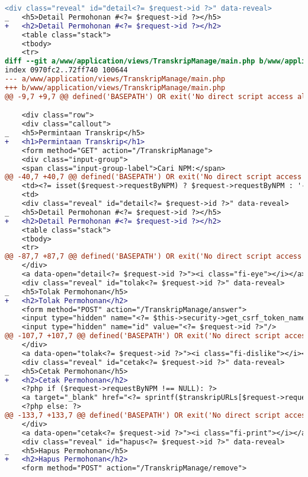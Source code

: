 \begin{itemize}
\begin{lstlisting}[frame=single, label={lst:perbaikan_1.3.1_tag_heading}, language=diff, caption=Perbaikan Kriteria Sukses 1.3.1 pada Bagian \textit{Heading}]
    <div class="reveal" id="detail<?= $request->id ?>" data-reveal>
_   <h5>Detail Permohonan #<?= $request->id ?></h5>
+   <h2>Detail Permohonan #<?= $request->id ?></h2>
    <table class="stack">
    <tbody>
    <tr>
diff --git a/www/application/views/TranskripManage/main.php b/www/application/views/TranskripManage/main.php
index 0970fc2..72ff740 100644
--- a/www/application/views/TranskripManage/main.php
+++ b/www/application/views/TranskripManage/main.php
@@ -9,7 +9,7 @@ defined('BASEPATH') OR exit('No direct script access allowed');

    <div class="row">
    <div class="callout">
_   <h5>Permintaan Transkrip</h5>
+   <h1>Permintaan Transkrip</h1>
    <form method="GET" action="/TranskripManage">
    <div class="input-group">
    <span class="input-group-label">Cari NPM:</span>
@@ -40,7 +40,7 @@ defined('BASEPATH') OR exit('No direct script access allowed');
    <td><?= isset($request->requestByNPM) ? $request->requestByNPM : '-' ?></td>
    <td>
    <div class="reveal" id="detail<?= $request->id ?>" data-reveal>
_   <h5>Detail Permohonan #<?= $request->id ?></h5>
+   <h2>Detail Permohonan #<?= $request->id ?></h2>
    <table class="stack">
    <tbody>
    <tr>
@@ -87,7 +87,7 @@ defined('BASEPATH') OR exit('No direct script access allowed');
    </div>
    <a data-open="detail<?= $request->id ?>"><i class="fi-eye"></i></a>
    <div class="reveal" id="tolak<?= $request->id ?>" data-reveal>
_   <h5>Tolak Permohonan</h5>
+   <h2>Tolak Permohonan</h2>
    <form method="POST" action="/TranskripManage/answer">
    <input type="hidden" name="<?= $this->security->get_csrf_token_name() ?>" value="<?= $this->security->get_csrf_hash() ?>" />
    <input type="hidden" name="id" value="<?= $request->id ?>"/>
@@ -107,7 +107,7 @@ defined('BASEPATH') OR exit('No direct script access allowed');
    </div>
    <a data-open="tolak<?= $request->id ?>"><i class="fi-dislike"></i></a>
    <div class="reveal" id="cetak<?= $request->id ?>" data-reveal>
_   <h5>Cetak Permohonan</h5>
+   <h2>Cetak Permohonan</h2>
    <?php if ($request->requestByNPM !== NULL): ?>
    <a target="_blank" href="<?= sprintf($transkripURLs[$request->requestType], $request->requestByNPM) ?>">Klik untuk membuka DPS/LHS</a>
    <?php else: ?>
@@ -133,7 +133,7 @@ defined('BASEPATH') OR exit('No direct script access allowed');
    </div>
    <a data-open="cetak<?= $request->id ?>"><i class="fi-print"></i></a>
    <div class="reveal" id="hapus<?= $request->id ?>" data-reveal>
_   <h5>Hapus Permohonan</h5>
+   <h2>Hapus Permohonan</h2>
    <form method="POST" action="/TranskripManage/remove">

\end{lstlisting}
\end{itemize}
